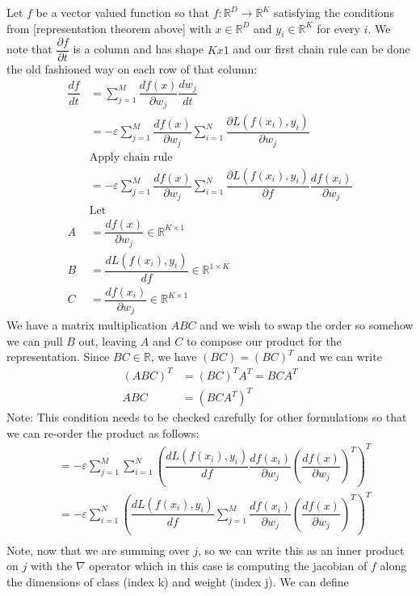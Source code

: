 Let $f$ be a vector valued function so that $f : \mathbb{R}^D \to \mathbb{R}^K$  satisfying the conditions from [representation theorem above] with $x \in \mathbb{R}^D$ and $y_i \in \mathbb{R}^K$ for every $i$. We note that $\dfrac{\partial f}{\partial t}$ is a column and has shape $Kx1$ and our first chain rule can be done the old fashioned way on each row of that column:
\begin{align}
    \dfrac{d f}{d t} &= \sum_{j=1}^M \dfrac{d f(x)}{\partial w_j} \dfrac{d w_j}{d t}\\
    &= -\varepsilon \sum_{j=1}^M \dfrac{d f(x)}{\partial w_j} \sum_{i=1}^N \dfrac{\partial L(f(x_i), y_i)}{\partial w_j}\\
    &\text{Apply chain rule}\\
    &= -\varepsilon \sum_{j=1}^M \dfrac{d f(x)}{\partial w_j} \sum_{i=1}^N \dfrac{\partial L(f(x_i), y_i)}{\partial f}\dfrac{d f(x_i)}{\partial w_j}\\
    &\text{Let}\\
    A &= \dfrac{d f(x)}{\partial w_j} \in \mathbb{R}^{K \times 1}\\
    B &= \dfrac{d L(f(x_i), y_i)}{d f} \in \mathbb{R}^{1 \times K}\\
    C &= \dfrac{d f(x_i)}{\partial w_j} \in \mathbb{R}^{K \times 1}
\end{align}
We have a matrix multiplication $ABC$ and we wish to swap the order so somehow we can pull $B$ out, leaving $A$ and $C$ to compose our product for the representation. Since $BC \in \mathbb{R}$, we have $(BC) = (BC)^T$ and we can write
\begin{align}
    (ABC)^T &= (BC)^TA^T = BCA^T\\
    ABC &= (BCA^T)^T
\end{align}
Note: This condition needs to be checked carefully for other formulations so that we can re-order the product as follows:
\begin{align}
        &= -\varepsilon \sum_{j=1}^M  \sum_{i=1}^N \left(\dfrac{d L(f(x_i), y_i)}{d f} 
        \dfrac{d f(x_i)}{\partial w_j} \left(\dfrac{d f(x)}{\partial  w_j}\right)^T\right)^T
        \\
    &= -\varepsilon \sum_{i=1}^N \left(\dfrac{d L(f(x_i), y_i)}{d f} 
    \sum_{j=1}^M \dfrac{d f(x_i)}{\partial w_j} \left(\dfrac{d f(x)}{\partial w_j}\right)^T\right)^T\\        
\end{align}
Note, now that we are summing over $j$, so we can write this as an inner product on $j$ with the $\nabla$ operator which in this case is computing the jacobian of $f$ along the dimensions of class (index k) and weight (index j). We can define 
